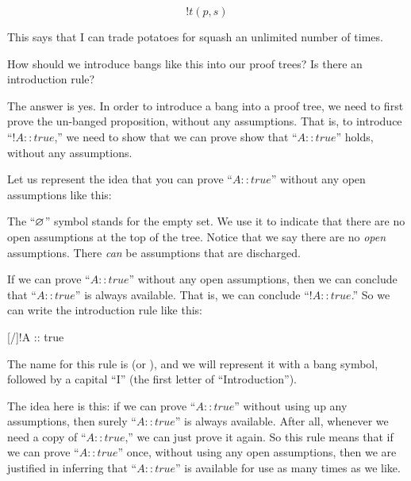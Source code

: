 \documentclass[../../../main.tex]{subfiles}
\begin{document}
\begin{equation*}
  !t(p, s)
\end{equation*}

\noindent
This says that I can trade potatoes for squash an unlimited number of times. 

How should we introduce bangs like this into our proof trees? Is there an introduction rule?

The answer is yes. In order to introduce a bang into a proof tree, we need to first prove the un-banged proposition, without any assumptions. That is, to introduce ``$!A :: true$,'' we need to show that we can prove show that ``$A :: true$'' holds, without any assumptions.

Let us represent the idea that you can prove ``$A :: true$'' without any open assumptions like this:

\begin{prooftree*}
  \hypo{\emptyassumptions/}
\end{prooftree*}

\noindent
The ``$\emptyassumptions/$'' symbol stands for the empty set. We use it to indicate that there are no open assumptions at the top of the tree. Notice that we say there are no \emph{open} assumptions. There \emph{can} be assumptions that are discharged.

If we can prove ``$A :: true$'' without any open assumptions, then we can conclude that ``$A :: true$'' is always available. That is, we can conclude ``$!A :: true$.'' So we can write the introduction rule like this:

\begin{prooftree*}
  \hypo{\emptyassumptions/}
  [\bangIntro/]{!A :: true}
\end{prooftree*}

\noindent
The name for this rule is  (or ), and we will represent it with a bang symbol, followed by a capital ``I'' (the first letter of ``Introduction'').

The idea here is this: if we can prove ``$A :: true$'' without using up any assumptions, then surely ``$A :: true$'' is always available. After all, whenever we need a copy of ``$A :: true$,'' we can just prove it again. So this rule means that if we can prove ``$A :: true$'' once, without using any open assumptions, then we are justified in inferring that ``$A :: true$'' is available for use as many times as we like.
\end{document}
